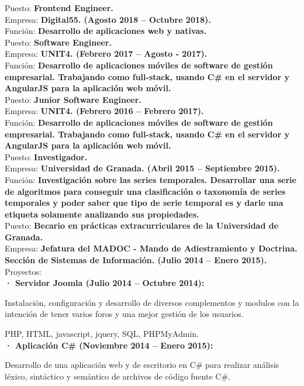 \documentclass	[10pt,a4paper,oneside]{article}
\begin{document}
Puesto: \textbf{Frontend Engineer.}\\
Empresa: \textbf{Digital55. (Agosto 2018 – Octubre 2018).}\\
Función: \textbf{Desarrollo de aplicaciones web y nativas.}\\

Puesto: \textbf{Software Engineer.}\\
Empresa: \textbf{UNIT4. (Febrero 2017 – Agosto - 2017).}\\
Función: \textbf{Desarrollo de aplicaciones móviles de software de gestión empresarial. Trabajando como full-stack, usando C\# en el servidor y AngularJS para la aplicación web móvil.}\\

Puesto: \textbf{Junior Software Engineer.}\\
Empresa: \textbf{UNIT4. (Febrero 2016 – Febrero 2017).}\\
Función: \textbf{Desarrollo de aplicaciones móviles de software de gestión empresarial. Trabajando como full-stack, usando C\# en el servidor y AngularJS para la aplicación web móvil.}\\

Puesto: \textbf{Investigador.}\\
Empresa: \textbf{Universidad de Granada. (Abril 2015 – Septiembre 2015).}\\
Función: \textbf{Investigación sobre las series temporales. Desarrollar una serie de algoritmos para conseguir una clasificación o taxonomía de series temporales y poder saber que tipo de serie temporal es y darle una etiqueta solamente analizando sus propiedades.}\\

Puesto: \textbf{Becario en prácticas extracurriculares de la Universidad de Granada.}\\
Empresa: \textbf{Jefatura del MADOC - Mando de Adiestramiento y Doctrina. Sección de Sistemas de Información. (Julio 2014 – Enero 2015).}\\
Proyectos:\\
\hspace*{1cm}\textbf{· Servidor Joomla (Julio 2014 – Octubre 2014):}\par
{\addtolength{\leftskip}{2cm}Instalación, configuraci\'on y desarrollo de diversos complementos y modulos con la intención de tener varios foros y una mejor gestión de los usuarios.\par}
\hspace*{2cm}PHP, HTML, javascript, jquery, SQL, PHPMyAdmin.\\
\hspace*{1cm}\textbf{· Aplicación C\# (Noviembre 2014 – Enero 2015):}\par
{\addtolength{\leftskip}{2cm}
Desarrollo de una aplicación web y de escritorio en C\# para realizar análisis léxico, sintáctico y semántico de archivos de código fuente C\#.\par}
\end{document}

